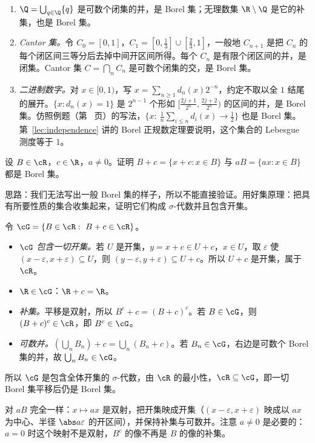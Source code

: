\begin{example}
\begin{enumerate}
\item $\Q=\bigcup_{q\in\Q}\{q\}$ 是可数个闭集的并，是 Borel 集；无理数集 $\R\setminus\Q$ 是它的补集，也是 Borel 集。
\item \emph{Cantor 集。}令 $C_0=[0,1]$，$C_1=[0,\frac13]\cup[\frac23,1]$，一般地 $C_{n+1}$ 是把 $C_n$ 的每个闭区间三等分后去掉中间开区间所得。每个 $C_n$ 是有限个闭区间的并，是闭集。Cantor 集 $C=\bigcap_nC_n$ 是可数个闭集的交，是 Borel 集。
\item \emph{二进制数字。}对 $x\in[0,1)$，写 $x=\sum_{n\geqslant1}d_n(x)2^{-n}$，约定不取以全 $1$ 结尾的展开。$\{x: d_n(x)=1\}$ 是 $2^{n-1}$ 个形如 $[\frac{2j+1}{2^n},\frac{2j+2}{2^n})$ 的区间的并，是 Borel 集。仿照例题（第~\pageref{we:set-systems:slln-event} 页）的写法，$\{x:\ \frac1n\sum_{i\leqslant n}d_i(x)\to\frac12\}$ 也是 Borel 集。第~\ref{lec:independence} 讲的 Borel 正规数定理要说明，这个集合的 Lebesgue 测度等于 $1$。
\end{enumerate}
\end{example}

\begin{workedexample}\label{we:set-systems:translation}
设 $B\in\cR$，$c\in\R$，$a\neq0$。证明 $B+c=\{x+c:x\in B\}$ 与 $aB=\{ax:x\in B\}$ 都是 Borel 集。
\end{workedexample}
\begin{solution}
思路：我们无法写出一般 Borel 集的样子，所以不能直接验证。用好集原理：把具有所要性质的集合收集起来，证明它们构成 $\sigma$-代数并且包含开集。

令 $\cG=\{B\in\cR:\ B+c\in\cR\}$。
\begin{itemize}
\item \emph{$\cG$ 包含一切开集。}若 $U$ 是开集，$y=x+c\in U+c$，$x\in U$，取 $\varepsilon$ 使 $(x-\varepsilon,x+\varepsilon)\subseteq U$，则 $(y-\varepsilon,y+\varepsilon)\subseteq U+c$。所以 $U+c$ 是开集，属于 $\cR$。
\item \emph{$\R\in\cG$}：$\R+c=\R$。
\item \emph{补集。}平移是双射，所以 $B^c+c=(B+c)^c$。若 $B\in\cG$，则 $(B+c)^c\in\cR$，即 $B^c\in\cG$。
\item \emph{可数并。}$(\bigcup_nB_n)+c=\bigcup_n(B_n+c)$。若 $B_n\in\cG$，右边是可数个 Borel 集的并，故 $\bigcup_nB_n\in\cG$。
\end{itemize}
所以 $\cG$ 是包含全体开集的 $\sigma$-代数，由 $\cR$ 的最小性，$\cR\subseteq\cG$，即一切 Borel 集平移后仍是 Borel 集。

对 $aB$ 完全一样：$x\mapsto ax$ 是双射，把开集映成开集（$(x-\varepsilon,x+\varepsilon)$ 映成以 $ax$ 为中心、半径 $\abs a\varepsilon$ 的开区间），并保持补集与可数并。注意 $a\neq0$ 是必要的：$a=0$ 时这个映射不是双射，$B^c$ 的像不再是 $B$ 的像的补集。
\end{solution}

